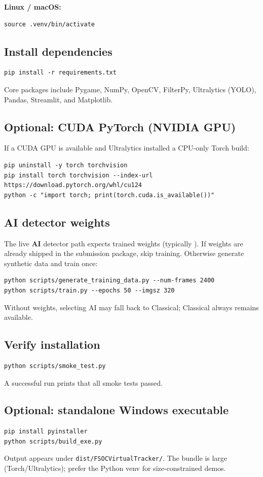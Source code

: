 \documentclass[11pt,a4paper]{article}
\begin{document}
\noindent\textbf{Linux / macOS:}
\begin{lstlisting}
source .venv/bin/activate
\end{lstlisting}

\subsection{Install dependencies}
\begin{lstlisting}
pip install -r requirements.txt
\end{lstlisting}
Core packages include Pygame, NumPy, OpenCV, FilterPy, Ultralytics (YOLO), Pandas, Streamlit, and Matplotlib.

\subsection{Optional: CUDA PyTorch (NVIDIA GPU)}
If a CUDA GPU is available and Ultralytics installed a CPU-only Torch build:
\begin{lstlisting}
pip uninstall -y torch torchvision
pip install torch torchvision --index-url https://download.pytorch.org/whl/cu124
python -c "import torch; print(torch.cuda.is_available())"
\end{lstlisting}

\subsection{AI detector weights}
The live \textbf{AI} detector path expects trained weights (typically ).
If weights are already shipped in the submission package, skip training.
Otherwise generate synthetic data and train once:
\begin{lstlisting}
python scripts/generate_training_data.py --num-frames 2400
python scripts/train.py --epochs 50 --imgsz 320
\end{lstlisting}
Without weights, selecting AI may fall back to Classical; Classical always remains available.

\subsection{Verify installation}
\begin{lstlisting}
python scripts/smoke_test.py
\end{lstlisting}
A successful run prints that all smoke tests passed.

\subsection{Optional: standalone Windows executable}
\begin{lstlisting}
pip install pyinstaller
python scripts/build_exe.py
\end{lstlisting}
Output appears under \texttt{dist/FSOCVirtualTracker/}.
The bundle is large (Torch/Ultralytics); prefer the Python venv for size-constrained demos.
\end{document}
